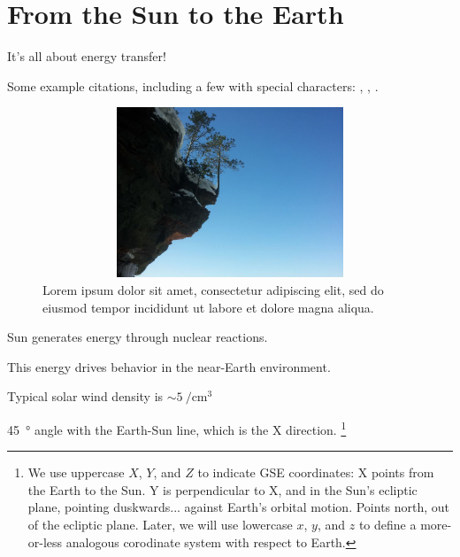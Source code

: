 
\chapter{From the Sun to the Earth}
\label{ch_intro}

It's all about energy transfer! 

Some example citations, including a few with special characters: \cite{dai_2013}, \cite{dai_2015}, \cite{lysak_2001}. 




\begin{figure}
  \includegraphics[width=5.75in, height=2in]{figures/image.jpg}
  \caption{Lorem ipsum dolor sit amet, consectetur adipiscing elit, sed do eiusmod tempor incididunt ut labore et dolore magna aliqua.}
  \label{fig_test}
\end{figure}

Sun generates energy through nuclear reactions. 

This energy drives behavior in the near-Earth environment. 

Typical solar wind density is $\sim \SI{5}{/\cm^3}$


\SI{45}{\degree} angle with the Earth-Sun line, which is the X direction. 
\footnote{We use uppercase $X$, $Y$, and $Z$ to indicate GSE coordinates: X points from the Earth to the Sun. Y is perpendicular to X, and in the Sun's ecliptic plane, pointing duskwards... against Earth's orbital motion. Points north, out of the ecliptic plane. Later, we will use lowercase $x$, $y$, and $z$ to define a more-or-less analogous corodinate system with respect to Earth.}

